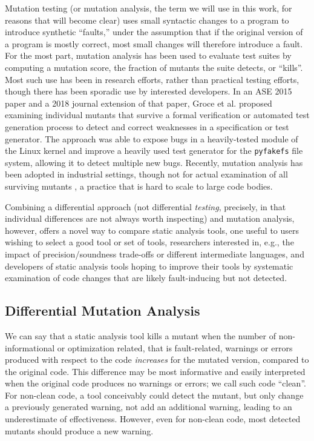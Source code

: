 Mutation testing \cite{jia2011analysis,demillo1978hints,budd1980theoretical} (or mutation analysis, the term we will use in this work, for reasons that will become clear) uses small syntactic changes to a program to introduce synthetic ``faults,'' under the assumption that if the original version of a program is mostly correct, most small changes will therefore introduce a fault.  For the most part, mutation analysis has been used to evaluate test suites by computing a mutation score, the fraction of mutants the suite detects, or ``kills''.  Most such use has been in research efforts, rather than practical testing efforts, though there has been sporadic use by interested developers.
In an ASE 2015 \cite{groce2015verified} paper and a 2018 journal extension \cite{groce2018verified} of that paper, Groce et al. proposed examining individual mutants that survive a formal verification or automated test generation process to detect and correct weaknesses in a specification or test generator.  The approach was able to expose bugs in a heavily-tested module of the Linux kernel \cite{mutKernel} and improve a heavily used test generator for the {\tt pyfakefs} file system, allowing it to detect multiple new bugs.  Recently, mutation analysis has been adopted in industrial settings, though not for actual examination of all surviving mutants \cite{MutGoogle,ivankovic2018industrial}, a practice that is hard to scale to large code bodies.

Combining a differential approach (not differential \emph{testing}, precisely, in that individual differences are not always worth inspecting) and mutation analysis, however, offers a novel way to compare static analysis tools, one useful to users wishing to select a good tool or set of tools, researchers interested in, e.g., the impact of precision/soundness trade-offs or different intermediate languages, and developers of static analysis tools hoping to improve their tools by systematic examination of code changes that are likely fault-inducing but not detected.

\subsection{Differential Mutation Analysis}

We can say that a static analysis tool kills a mutant when the number of non-informational or optimization related, that is fault-related, warnings or errors produced with respect to the code \emph{increases} for the mutated version, compared to the original code.  This difference may be most informative and easily interpreted when the original code produces no warnings or errors; we call such code ``clean''. For non-clean code, a tool conceivably could detect the mutant, but only change a previously generated warning, not add an additional warning, leading to an underestimate of effectiveness.  However, even for non-clean code, most detected mutants should produce a new warning.


